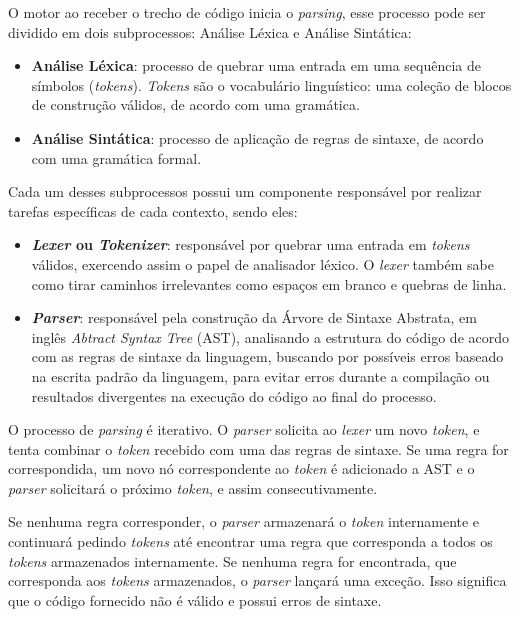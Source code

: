 

O motor ao receber o trecho de código inicia o \textit{parsing}, esse processo pode ser
dividido em dois subprocessos: Análise Léxica e Análise Sintática:

\begin{itemize}
    \item \textbf{Análise Léxica}: processo de quebrar uma entrada em uma sequência de
    símbolos (\textit{tokens}). \textit{Tokens} são o vocabulário linguístico: uma
    coleção de blocos de construção válidos, de acordo com uma gramática.
    \item \textbf{Análise Sintática}: processo de aplicação de regras de sintaxe, de
    acordo com uma gramática formal.
\end{itemize}

Cada um desses subprocessos possui um componente responsável por realizar tarefas
específicas de cada contexto, sendo eles:

\begin{itemize}
    \item \textbf{\textit{Lexer} ou \textit{Tokenizer}}: responsável por quebrar uma
    entrada em \textit{tokens} válidos, exercendo assim o papel de analisador léxico. O
    \textit{lexer} também sabe como tirar caminhos irrelevantes como espaços em branco e
    quebras de linha.
    \item \textbf{\textit{Parser}}: responsável pela construção da Árvore de Sintaxe
    Abstrata, em inglês \textit{Abtract Syntax Tree} (AST), analisando a estrutura do
    código de acordo com as regras de sintaxe da linguagem, buscando por possíveis erros
    baseado na escrita padrão da linguagem, para evitar erros durante a compilação ou
    resultados divergentes na execução do código ao final do processo.
\end{itemize}

O processo de \textit{parsing} é iterativo. O \textit{parser} solicita ao \textit{lexer}
um novo \textit{token}, e tenta combinar o \textit{token} recebido com uma das regras de
sintaxe. Se uma regra for correspondida, um novo nó correspondente ao \textit{token} é
adicionado a AST e o \textit{parser} solicitará o próximo \textit{token}, e assim
consecutivamente.

Se nenhuma regra corresponder, o \textit{parser} armazenará o \textit{token} internamente
e continuará pedindo \textit{tokens} até encontrar uma regra que corresponda a todos os
\textit{tokens} armazenados internamente. Se nenhuma regra for encontrada, que corresponda
aos \textit{tokens} armazenados, o \textit{parser} lançará uma exceção. Isso significa que o
código fornecido não é válido e possui erros de sintaxe.

